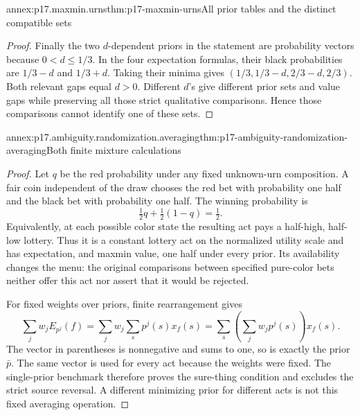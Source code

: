 \begin{annexitem}{annex:p17.maxmin.urns}{thm:p17-maxmin-urns}{All prior tables and the distinct compatible sets}
\begin{proof}
Finally the two \(d\)-dependent
priors in the statement are
probability vectors because
\(0<d\leq1/3\).
In the four expectation formulas,
their black probabilities are
\(1/3-d\) and \(1/3+d\).
Taking their minima gives
\((1/3,1/3-d,2/3-d,2/3)\).
Both relevant gaps equal \(d>0\).
Different \(d\)'s give different
prior sets and value gaps while
preserving all those strict
qualitative comparisons. Hence
those comparisons cannot identify
one of these sets.
\end{proof}
\end{annexitem}

\begin{annexitem}{annex:p17.ambiguity.randomization.averaging}{thm:p17-ambiguity-randomization-averaging}{Both finite mixture calculations}
\begin{proof}
Let \(q\) be the red probability
under any fixed unknown-urn composition.
A fair coin independent of the draw
chooses the red bet with probability
one half and the black bet with
probability one half. The winning
probability is
\[
                        \tfrac12 q+\tfrac12(1-q)=\tfrac12.
\]
Equivalently, at each possible color
state the resulting act pays a
half-high, half-low lottery. Thus
it is a constant lottery act on
the normalized utility scale and
has expectation, and maxmin value,
one half under every prior.
Its availability changes the menu:
the original comparisons between
specified pure-color bets neither
offer this act nor assert that it
would be rejected.

For fixed weights over priors,
finite rearrangement gives
\[
 \sum_jw_jE_{p^j}(f)
       =\sum_jw_j\sum_sp^j(s)x_f(s)
       =\sum_s\left(\sum_jw_jp^j(s)\right)x_f(s).
\]
The vector in parentheses is
nonnegative and sums to one, so
is exactly the prior \(\bar p\).
The same vector is used for every
act because the weights were fixed.
The single-prior benchmark therefore
proves the sure-thing condition
and excludes the strict source
reversal. A different minimizing
prior for different acts is not
this fixed averaging operation.
\end{proof}
\end{annexitem}


